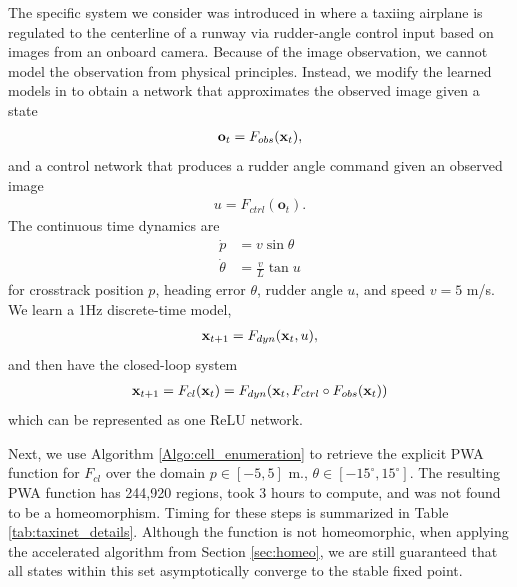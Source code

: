 The specific system we consider was introduced in \cite{verify_gan} where a taxiing airplane is regulated to the centerline of a runway via rudder-angle control input based on images from an onboard camera. Because of the image observation, we cannot model the observation from physical principles. Instead, we modify the learned models in \cite{verify_gan} to obtain a network that approximates the observed image given a state
\begin{align}
    \mathbf{o}_t = F_{obs}(\mathbf{x}_t),
\end{align}
and a control network that produces a rudder angle command given an observed image
\begin{align}
    u = F_{ctrl}(\mathbf{o}_t).
\end{align}
The continuous time dynamics are
\begin{subequations}
\begin{align}
    \dot{p} &= v\sin{\theta} \\
    \dot{\theta} &= \frac{v}{L}\tan{u}
\end{align}
\end{subequations}
for crosstrack position $p$, heading error $\theta$, rudder angle $u$, and speed $v=5$ m/s. We learn a 1Hz discrete-time model,
\begin{align}
    \mathbf{x}_{t+1} = F_{dyn}(\mathbf{x}_t, u),
\end{align}
and then have the closed-loop system
\begin{align}
    \mathbf{x}_{t+1} = F_{cl}(\mathbf{x}_t) = F_{dyn}(\mathbf{x}_t, F_{ctrl} \circ F_{obs}(\mathbf{x}_t))
\end{align}
which can be represented as one ReLU network.

Next, we use Algorithm \ref{Algo:cell_enumeration} to retrieve the explicit PWA function for $F_{cl}$ over the domain $p \in [-5, 5]$ m., $\theta \in [-15^\circ, 15^\circ]$. 
The resulting PWA function has 244,920 regions, took 3 hours to compute, and was not found to be a homeomorphism.
Timing for these steps is summarized in Table \ref{tab:taxinet_details}.
Although the function is not homeomorphic, when applying the accelerated algorithm from Section \ref{sec:homeo}, we are still guaranteed that all states within this set asymptotically converge to the stable fixed point.



